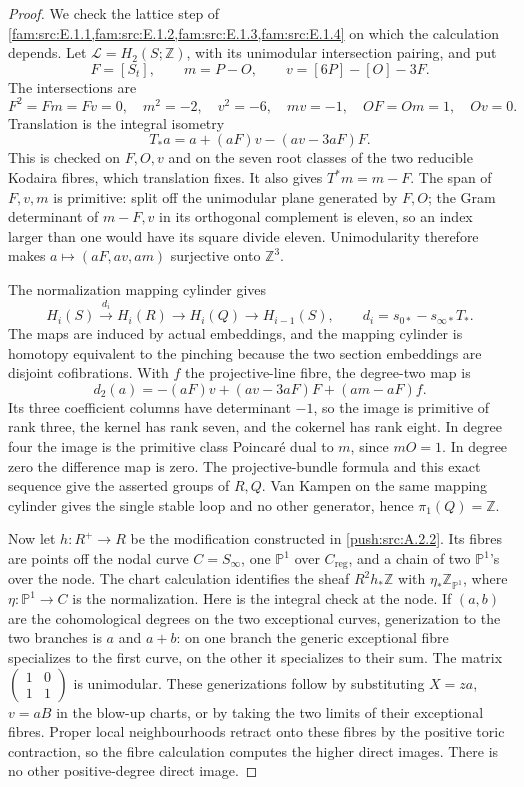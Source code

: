 \begin{proof}
We check the lattice step of \cref{fam:src:E.1.1,fam:src:E.1.2,fam:src:E.1.3,fam:src:E.1.4} on which the calculation depends.
Let $\mathcal L=H_2(S;\mathbb Z)$, with its unimodular intersection
pairing, and put
\[
 F=[S_t],\qquad m=P-O,\qquad v=[6P]-[O]-3F.
\]
The intersections are
\[
 F^2=Fm=Fv=0,\quad m^2=-2,\quad v^2=-6,\quad mv=-1,
 \quad OF=Om=1,\quad Ov=0.
\]
Translation is the integral isometry
\[
 T_*a=a+(aF)v-(av-3aF)F.
\]
This is checked on $F,O,v$ and on the seven root classes of
the two reducible Kodaira fibres, which translation fixes.
It also gives $T^*m=m-F$. The span of $F,v,m$ is primitive:
split off the unimodular plane generated by $F,O$; the Gram
determinant of $m-F,v$ in its orthogonal complement is eleven,
so an index larger than one would have its square divide eleven.
Unimodularity therefore makes
$a\mapsto(aF,av,am)$ surjective onto $\mathbb Z^3$.

The normalization mapping cylinder gives
\[
 H_i(S)\xrightarrow{d_i}H_i(R)\longrightarrow H_i(Q)
 \longrightarrow H_{i-1}(S),\qquad
 d_i=s_{0*}-s_{\infty*}T_*.
\]
The maps are induced by actual embeddings, and the mapping
cylinder is homotopy equivalent to the pinching because the
two section embeddings are disjoint cofibrations. With $f$ the
projective-line fibre, the degree-two map is
\[
 d_2(a)=-(aF)v+(av-3aF)F+(am-aF)f.
\]
Its three coefficient columns have determinant $-1$, so the
image is primitive of rank three, the kernel has rank seven,
and the cokernel has rank eight. In degree four the image is
the primitive class Poincar\'e dual to $m$, since $mO=1$.
In degree zero the difference map is zero. The projective-bundle
formula and this exact sequence give the asserted groups of
$R,Q$. Van Kampen on the same mapping cylinder gives the
single stable loop and no other generator, hence
$\pi_1(Q)=\mathbb Z$.

Now let $h:R^+\to R$ be the modification constructed in \ref{push:src:A.2.2}.
Its fibres are points off the nodal curve $C=S_\infty$, one
$\mathbb P^1$ over $C_{\mathrm{reg}}$, and a chain of two
$\mathbb P^1$'s over the node. The chart calculation identifies
the sheaf $R^2h_*\mathbb Z$ with
$\eta_*\mathbb Z_{\mathbb P^1}$, where
$\eta:\mathbb P^1\to C$ is the normalization. Here is the
integral check at the node. If $(a,b)$ are the cohomological
degrees on the two exceptional curves, generization to the
two branches is $a$ and $a+b$: on one branch the generic
exceptional fibre specializes to the first curve, on the
other it specializes to their sum. The matrix
$\left(\begin{smallmatrix}1&0\\1&1\end{smallmatrix}\right)$
is unimodular. These generizations follow by substituting
$X=za$, $v=aB$ in the blow-up charts, or by taking the two
limits of their exceptional fibres. Proper local neighbourhoods
retract onto these fibres by the positive toric contraction,
so the fibre calculation computes the higher direct images.
There is no other positive-degree direct image.


\end{proof}
